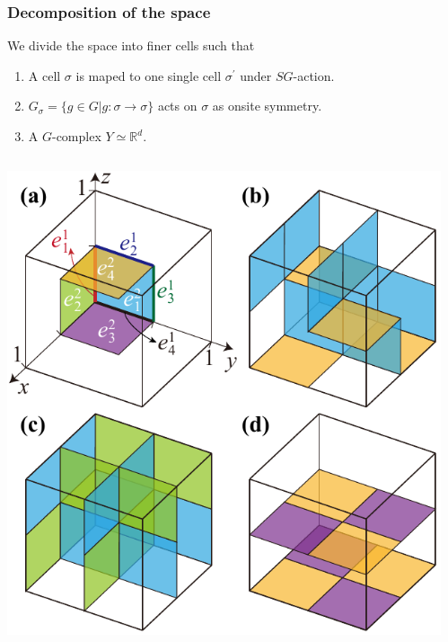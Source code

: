 \documentclass[xcolor=table, 11pt, aspectratio=43]{beamer}
\begin{document}
\begin{frame}
	\frametitle{Decomposition of the space}
	We divide the space into finer cells such that
	\begin{enumerate}
		\item A cell $\sigma$ is maped to one single cell $\sigma^\prime$ under $SG$-action.
		\item $G_\sigma=\{g\in G|g:\sigma\rightarrow\sigma\}$ acts on $\sigma$ as onsite symmetry.
		\item A $G$-complex $Y\simeq \mathbb R^d$.
	\end{enumerate}
	\begin{columns}
		\begin{center}
			\includegraphics[width=.5\textwidth]{blocks}
		\end{center}
		\begin{center}
		\end{center}
	\end{columns}
\end{frame}
\end{document}
